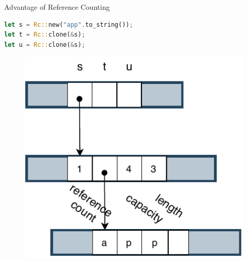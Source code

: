 \documentclass[9pt]{beamer}
\begin{document}

\begin{frame}[t, fragile]{Advantage of Reference Counting}
\vspace{-0.5cm}
\begin{minipage}{0.7\linewidth}
\begin{lstlisting}[language=Rust]
let s = Rc::new("app".to_string());
let t = Rc::clone(&s);
let u = Rc::clone(&s); 
\end{lstlisting}
\end{minipage}     

    \begin{minipage}{0.3\linewidth}
        \begin{figure}[hp]
            \centering
            \begin{center}
                    \includegraphics[width=1.0\textwidth]{images/rc1.pdf}
                    \captionsetup{labelformat=empty}
            \end{center}
            

\end{figure}
\end{minipage}
\end{frame}
\end{document}
